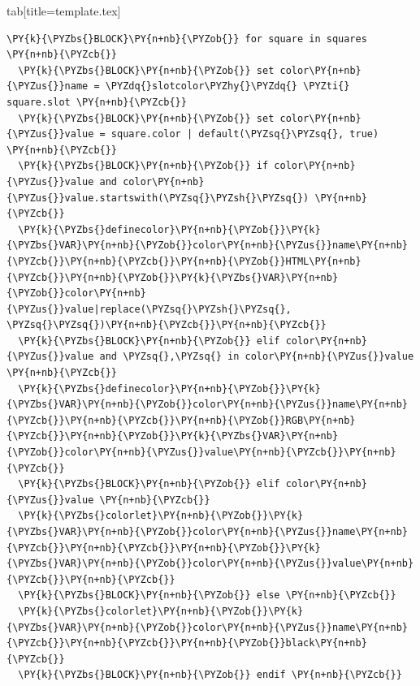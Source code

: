 \documentclass[a4paper,twoside]{article}
\begin{document}
\begin{tsdiv}{tab}[title=template.tex]
\begin{tscode}[lang=tex, engine=pygments]
\begin{Verbatim}[commandchars=\\\{\},breaklines, breakanywhere, commandchars=\\\{\}]
  \PY{k}{\PYZbs{}BLOCK}\PY{n+nb}{\PYZob{}} for square in squares \PY{n+nb}{\PYZcb{}}
  \PY{k}{\PYZbs{}BLOCK}\PY{n+nb}{\PYZob{}} set color\PY{n+nb}{\PYZus{}}name = \PYZdq{}slotcolor\PYZhy{}\PYZdq{} \PYZti{} square.slot \PY{n+nb}{\PYZcb{}}
  \PY{k}{\PYZbs{}BLOCK}\PY{n+nb}{\PYZob{}} set color\PY{n+nb}{\PYZus{}}value = square.color | default(\PYZsq{}\PYZsq{}, true) \PY{n+nb}{\PYZcb{}}
  \PY{k}{\PYZbs{}BLOCK}\PY{n+nb}{\PYZob{}} if color\PY{n+nb}{\PYZus{}}value and color\PY{n+nb}{\PYZus{}}value.startswith(\PYZsq{}\PYZsh{}\PYZsq{}) \PY{n+nb}{\PYZcb{}}
  \PY{k}{\PYZbs{}definecolor}\PY{n+nb}{\PYZob{}}\PY{k}{\PYZbs{}VAR}\PY{n+nb}{\PYZob{}}color\PY{n+nb}{\PYZus{}}name\PY{n+nb}{\PYZcb{}}\PY{n+nb}{\PYZcb{}}\PY{n+nb}{\PYZob{}}HTML\PY{n+nb}{\PYZcb{}}\PY{n+nb}{\PYZob{}}\PY{k}{\PYZbs{}VAR}\PY{n+nb}{\PYZob{}}color\PY{n+nb}{\PYZus{}}value|replace(\PYZsq{}\PYZsh{}\PYZsq{}, \PYZsq{}\PYZsq{})\PY{n+nb}{\PYZcb{}}\PY{n+nb}{\PYZcb{}}
  \PY{k}{\PYZbs{}BLOCK}\PY{n+nb}{\PYZob{}} elif color\PY{n+nb}{\PYZus{}}value and \PYZsq{},\PYZsq{} in color\PY{n+nb}{\PYZus{}}value \PY{n+nb}{\PYZcb{}}
  \PY{k}{\PYZbs{}definecolor}\PY{n+nb}{\PYZob{}}\PY{k}{\PYZbs{}VAR}\PY{n+nb}{\PYZob{}}color\PY{n+nb}{\PYZus{}}name\PY{n+nb}{\PYZcb{}}\PY{n+nb}{\PYZcb{}}\PY{n+nb}{\PYZob{}}RGB\PY{n+nb}{\PYZcb{}}\PY{n+nb}{\PYZob{}}\PY{k}{\PYZbs{}VAR}\PY{n+nb}{\PYZob{}}color\PY{n+nb}{\PYZus{}}value\PY{n+nb}{\PYZcb{}}\PY{n+nb}{\PYZcb{}}
  \PY{k}{\PYZbs{}BLOCK}\PY{n+nb}{\PYZob{}} elif color\PY{n+nb}{\PYZus{}}value \PY{n+nb}{\PYZcb{}}
  \PY{k}{\PYZbs{}colorlet}\PY{n+nb}{\PYZob{}}\PY{k}{\PYZbs{}VAR}\PY{n+nb}{\PYZob{}}color\PY{n+nb}{\PYZus{}}name\PY{n+nb}{\PYZcb{}}\PY{n+nb}{\PYZcb{}}\PY{n+nb}{\PYZob{}}\PY{k}{\PYZbs{}VAR}\PY{n+nb}{\PYZob{}}color\PY{n+nb}{\PYZus{}}value\PY{n+nb}{\PYZcb{}}\PY{n+nb}{\PYZcb{}}
  \PY{k}{\PYZbs{}BLOCK}\PY{n+nb}{\PYZob{}} else \PY{n+nb}{\PYZcb{}}
  \PY{k}{\PYZbs{}colorlet}\PY{n+nb}{\PYZob{}}\PY{k}{\PYZbs{}VAR}\PY{n+nb}{\PYZob{}}color\PY{n+nb}{\PYZus{}}name\PY{n+nb}{\PYZcb{}}\PY{n+nb}{\PYZcb{}}\PY{n+nb}{\PYZob{}}black\PY{n+nb}{\PYZcb{}}
  \PY{k}{\PYZbs{}BLOCK}\PY{n+nb}{\PYZob{}} endif \PY{n+nb}{\PYZcb{}}


\end{Verbatim}
\end{tscode}
\end{tsdiv}
\end{document}
